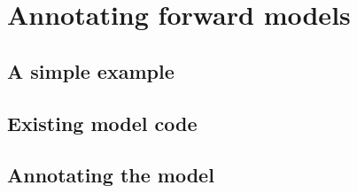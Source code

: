 \chapter{Annotating forward models}

\begin{synopsis}
\end{synopsis}
\minitoc
\vspace{\fill}
\newpage

\section{A simple example} \label{sec:examples}
\section{Existing model code}
\section{Annotating the model}
